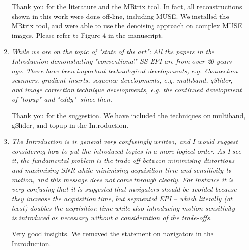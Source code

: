 \documentclass[a4paper,11pt,twoside]{report}
\begin{document}
\begin{enumerate}
    \hspace{1em} Thank you for the literature and the MRtrix tool.
    In fact, all reconstructions shown in this work were done off-line,
    including MUSE.
    We installed the MRtrix tool, and were able to use
    the denoising approach on complex MUSE images.
    Please refer to Figure 4 in the manuscript.

%

    \item \textit{While we are on the topic of "state of the art": All the papers in the Introduction demonstrating "conventional" SS-EPI are from over 20 years ago. There have been important technological developments, e.g. Connectom scanners, gradient inserts, sequence developments, e.g. multiband, gSlider, and image correction technique developments, e.g. the continued development of "topup" and "eddy", since then.}

    \hspace{1em} Thank you for the suggestion.
    We have included the techniques on multiband, gSlider, and topup
    in the Introduction.

    \item \textit{The Introduction is in general very confusingly written, and I would suggest considering how to put the introduced topics in a more logical order. As I see it, the fundamental problem is the trade-off between minimising distortions and maximising SNR while minimising acquisition time and sensitivity to motion, and this message does not come through clearly. For instance it is very confusing that it is suggested that navigators should be avoided because they increase the acquisition time, but segmented EPI -- which literally (at least) doubles the acquisition time while also introducing motion sensitivity -- is introduced as necessary without a consideration of the trade-offs.}

    \hspace{1em} Very good insights.
    We removed the statement on navigators in the Introduction.


\end{enumerate}
\end{document}
